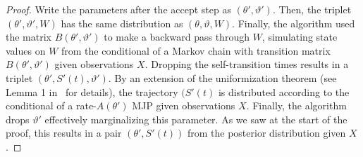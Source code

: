 \begin{proof}
Write the parameters after the accept step as $(\theta', \vartheta')$. 
Then, the triplet $(\theta', \vartheta',W)$ has the same distribution as $(\theta, \vartheta,W)$.
Finally, the algorithm used the matrix $B(\theta',\vartheta')$ to make a backward pass through $W$, simulating state values on $W$ from the conditional of a Markov chain with transition matrix $B(\theta',\vartheta')$ given observations $X$. 
Dropping the self-transition times results in a triplet $(\theta', S'(t), \vartheta')$. 
By an extension of the uniformization theorem (see Lemma 1 in~\cite{RaoTeh13} for details), the trajectory $(S'(t)$ is distributed according to the conditional of a rate-$A(\theta')$ MJP given observations $X$.
Finally, the algorithm drops $\vartheta'$ effectively marginalizing this parameter. 
As we saw at the start of the proof, this  results in a pair $(\theta',S'(t))$ from the posterior distribution given $X$.

\end{proof}
